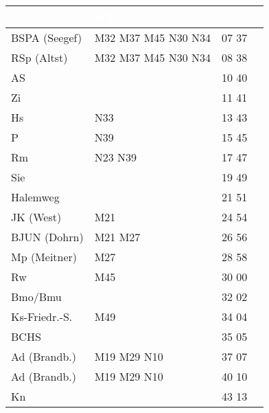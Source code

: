 \begin{tabular}{!{\color{schiefergrau}\vrule width 3pt}*{4}{l!{\color{schiefergrau}\vrule width 3pt}}}
\hline
{}
 & \textcolor{white}{\bfseries WE} \\
\hline
BSPA (Seegef)& \mbus{} M32 M37 M45 \nbus{} N30 N34         & 07 37 &             \\
RSp (Altst)  & \mbus{} M32 M37 M45 \nbus{} N30 N34         & 08 38 &             \\
AS           &                                             & 10 40 &             \\
Zi           &                                             & 11 41 &             \\
Hs           & \nbus{} N33                                 & 13 43 &             \\
P            & \nbus{} N39                                 & 15 45 &             \\
Rm           & \nbus{} N23 N39                             & 17 47 &             \\
Sie          &                                             & 19 49 &             \\
Halemweg     &                                             & 21 51 &             \\
JK (West)    & \mbus{} M21                                 & 24 54 &             \\
BJUN (Dohrn) & \mbus{} M21 M27                             & 26 56 &             \\
Mp (Meitner) & \mbus{} M27                                 & 28 58 &             \\
Rw           & \mbus{} M45                                 & 30 00 &             \\
Bmo/Bmu      & \nuzwei{}                                   & 32 02 &             \\
Ks-Friedr.-S.& \mbus{} M49                                 & 34 04 &             \\
BCHS         &                                             & 35 05 &             \\
Ad (Brandb.) & \mbus{} M19 M29 \nbus{} N10                 & 37 07 &             \\
\hline
Ad (Brandb.) & \mbus{} M19 M29 \nbus{} N10                 & 40 10 &             \\
Kn           &                                             & 43 13 &             \\

\end{tabular}
